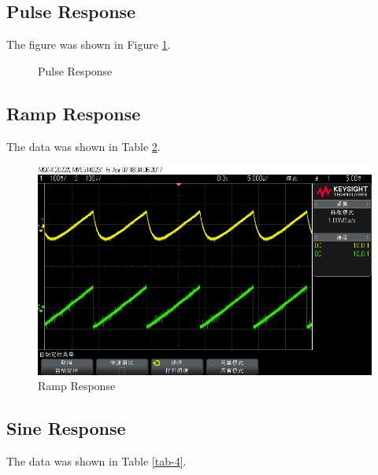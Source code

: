 \documentclass{article}
\begin{document}
\subsection{Pulse Response}
The figure was shown in Figure \ref{fig-2}.

\begin{figure}[htbp]
	\centering
	\caption{Pulse Response}
	\label{fig-2}
\end{figure}

\subsection{Ramp Response}
The data was shown in Table \ref{fig-3}.

\begin{figure}[htbp]
	\centering
	\includegraphics[width=0.7\linewidth]{3.bmp}
	\caption{Ramp Response}
	\label{fig-3}
\end{figure}

\subsection{Sine Response}
The data was shown in Table \ref{tab-4}.
\end{document}
